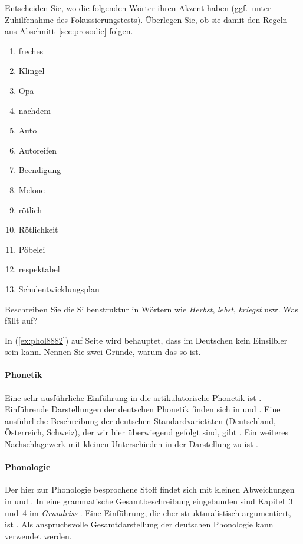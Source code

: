 \Uebung \label{u45} Entscheiden Sie, wo die folgenden Wörter ihren Akzent haben (ggf.\ unter Zuhilfenahme des Fokussierungstests).
Überlegen Sie, ob sie damit den Regeln aus Abschnitt~\ref{sec:prosodie} folgen.

\begin{enumerate}\Lf
  \item freches
  \item Klingel
  \item Opa
  \item nachdem
  \item Auto
  \item Autoreifen
  \item Beendigung
  \item Melone
  \item rötlich
  \item Rötlichkeit
  \item Pöbelei
  \item respektabel
  \item Schulentwicklungsplan
\end{enumerate}

\Uebung[\tristar] \label{u46} Beschreiben Sie die Silbenstruktur in Wörtern wie \textit{Herbst}, \textit{lebst}, \textit{kriegst} usw.
Was fällt auf?

\Uebung[\tristar] \label{u47} In (\ref{ex:phol8882}) auf Seite \pageref{ex:phol8882} wird behauptet, dass \textipa{[s5]} im Deutschen kein Einsilbler sein kann.
Nennen Sie zwei Gründe, warum das so ist.

\WeitereLiteratur

\paragraph*{Phonetik}

Eine sehr ausführliche Einführung in die artikulatorische Phonetik ist \citet{Laver94}.
Einführende Darstellungen der deutschen Phonetik finden sich \zB in \citet{RRKWS09} und \citet{Wiese10}.
Eine ausführliche Beschreibung der deutschen Standardvarietäten (Deutschland, Österreich, Schweiz), der wir hier überwiegend gefolgt sind, gibt \citet{Krech-ea2009}.
Ein weiteres Nachschlagewerk mit kleinen Unterschieden in der Darstellung zu \citealp{Krech-ea2009} ist \citet{Mangold06}.

\paragraph*{Phonologie}

\label{abs:pholliteratur}

Der hier zur Phonologie besprochene Stoff findet sich mit kleinen Abweichungen \zB in \citet{Hall00} und \citet{Wiese10}.
In eine grammatische Gesamtbeschreibung eingebunden sind Kapitel~3 und~4 im \textit{Grundriss} \citep{Eisenberg1}.
Eine Einführung, die eher strukturalistisch argumentiert, ist \citet{Ternes2012}.
Als anspruchsvolle Gesamtdarstellung der deutschen Phonologie kann \citet{Wiese00} verwendet werden.
